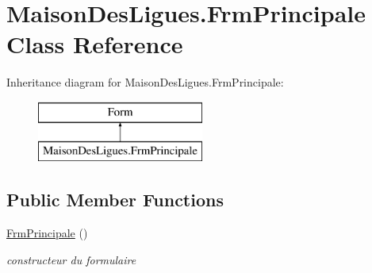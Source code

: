 \hypertarget{class_maison_des_ligues_1_1_frm_principale}{}\section{Maison\+Des\+Ligues.\+Frm\+Principale Class Reference}
\label{class_maison_des_ligues_1_1_frm_principale}
Inheritance diagram for Maison\+Des\+Ligues.\+Frm\+Principale\+:\begin{figure}[H]
\begin{center}
\leavevmode
\includegraphics[height=2.000000cm]{class_maison_des_ligues_1_1_frm_principale}
\end{center}
\end{figure}
\subsection*{Public Member Functions}
\begin{DoxyCompactItemize}
\item 
\hyperlink{class_maison_des_ligues_1_1_frm_principale_a57b3b29fd74de6dba450eeddb60b0bce}{Frm\+Principale} ()
\begin{DoxyCompactList}\small\item\em constructeur du formulaire \end{DoxyCompactList}\end{DoxyCompactItemize}
